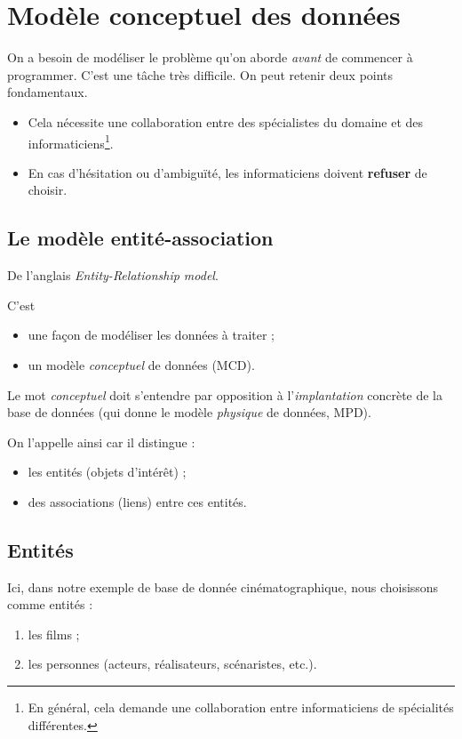 \section{Modèle conceptuel des données}

On a besoin de modéliser le problème qu'on aborde \emph{avant} de commencer à programmer.
C'est une tâche très difficile. On peut retenir deux points fondamentaux. 
\begin{itemize}
\item Cela nécessite une collaboration entre des spécialistes du domaine et des informaticiens\footnote{En
    général, cela demande une collaboration entre informaticiens de
    spécialités différentes.}.
\item En cas d'hésitation ou d'ambiguïté, les informaticiens doivent \textbf{refuser} de choisir.
\end{itemize}

\subsection{Le modèle entité-association}
De l'anglais \emph{Entity-Relationship model}. 

C'est 
\begin{itemize}
\item une façon de  modéliser les  données à traiter ;
\item un modèle \emph{conceptuel} de  données (MCD).
\end{itemize}
Le mot \emph{conceptuel} doit s'entendre par opposition à  l'\emph{implantation} concrète de la base de données (qui donne le modèle \emph{physique} de données, MPD).

On l'appelle ainsi car il distingue :
\begin{itemize}
\item les entités (objets d'intérêt) ;
\item des associations (liens) entre ces entités.
\end{itemize}
\subsection{Entités}
Ici, dans notre exemple de base de donnée cinématographique, nous choisissons comme entités :
  \begin{enumerate}
  \item les films ;
  \item les personnes (acteurs, réalisateurs, scénaristes, etc.).
  \end{enumerate}

